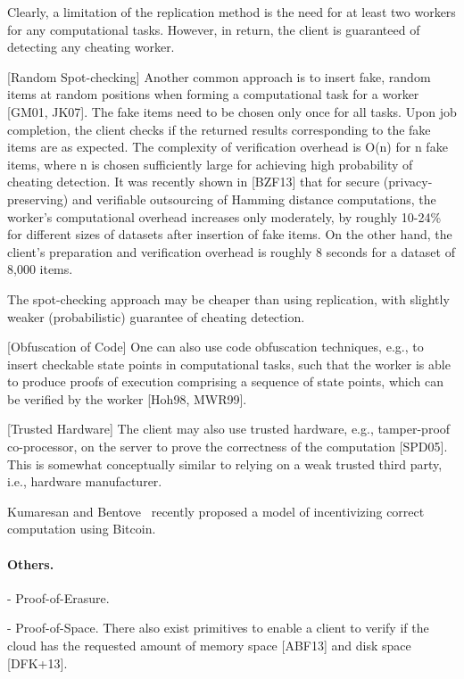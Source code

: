Clearly, a limitation of the replication method is the need for at least two workers for any computational tasks. However, in return, the client is guaranteed of detecting any cheating worker.

[Random Spot-checking]
Another common approach is to insert fake, random items at random positions when forming a computational task for a worker [GM01, JK07]. The fake items need to be chosen only once for all tasks. Upon job completion, the client checks if the returned results corresponding to the fake items are as expected. The complexity of verification overhead is O(n) for n fake items, where n is chosen sufficiently large for achieving high probability of cheating detection. It was recently shown in [BZF13] that for secure (privacy-preserving) and verifiable outsourcing of Hamming distance computations, the worker's computational overhead increases only moderately, by roughly 10-24\% for different sizes of datasets after insertion of fake items. On the other hand, the client's preparation and verification overhead is roughly 8 seconds for a dataset of 8,000 items.

The spot-checking approach may be cheaper than using replication, with slightly weaker (probabilistic) guarantee of cheating detection.

[Obfuscation of Code]
One can also use code obfuscation techniques, e.g., to insert checkable state points in computational tasks, such that the worker is able to produce proofs of execution comprising a sequence of state points, which can be verified by the worker [Hoh98, MWR99].

[Trusted Hardware]
The client may also use trusted hardware, e.g., tamper-proof co-processor, on the server to prove the correctness of the computation [SPD05]. This is somewhat conceptually similar to relying on a weak trusted third party, i.e., hardware manufacturer.

Kumaresan and Bentove~\cite{KB14} recently proposed a model of incentivizing correct computation using Bitcoin. 


\paragraph{Others.}

- Proof-of-Erasure.

- Proof-of-Space.
There also exist primitives to enable a client to verify if the cloud has the requested amount of memory space [ABF13] and disk space [DFK+13].


